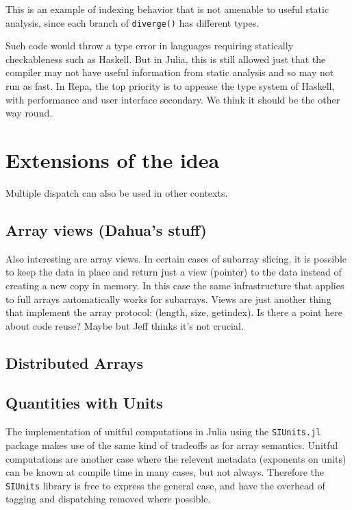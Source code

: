 \documentclass[preprint]{sigplanconf}
\newcommand{\code}[1]{\texttt{#1}}
\begin{document}
This is an example of indexing behavior that is not amenable to useful static
analysis, since each branch of \code{diverge()} has different types.


Such code would throw a type error in languages requiring statically
checkableness such as Haskell. But in Julia, this is still allowed just that
the compiler may not have useful information from static analysis and so may
not run as fast. In Repa, the top priority is to appease the type system of
Haskell, with performance and user interface secondary. We think it should be
the other way round.

\section{Extensions of the idea}

Multiple dispatch can also be used in other contexts.

\subsection{Array views (Dahua's stuff)}

Also interesting are array views. In certain cases of subarray slicing, it is
possible to keep the data in place and return just a view (pointer) to the
data instead of creating a new copy in memory. In this case the same
infrastructure that applies to full arrays automatically works for subarrays.
Views are just another thing that implement the array protocol: (length, size,
getindex). Is there a point here about code reuse? Maybe but Jeff thinks it's
not crucial.

\subsection{Distributed Arrays}

\subsection{Quantities with Units}

The implementation of unitful computations in Julia using the
\code{SIUnits.jl}\cite{Fischer:2014si} package makes use of the same kind of
tradeoffs as for array semantics. Unitful computations are another case
where the relevent metadata (exponents on units) can be
known at compile time in many cases, but not always. Therefore the
\code{SIUnits} library is free to express the general case, and have the
overhead of tagging and dispatching removed where possible.
\end{document}
